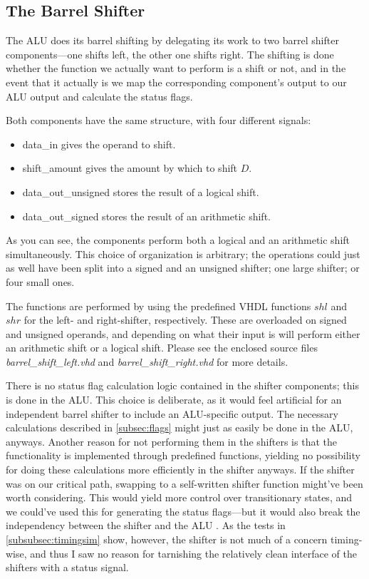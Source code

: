 \documentclass{article}
\begin{document}
\subsection{The Barrel Shifter}
\label{subsec:barrelshifter}
The ALU does its barrel shifting by delegating its work to two barrel shifter components---one shifts left, the other one shifts right. The shifting is done whether the function we actually want to perform is a shift or not, and in the event that it actually is we map the corresponding component's output to our ALU output and calculate the status flags. 

Both components have the same structure, with four different signals:
\begin{itemize}
\item data\_in gives the operand to shift.
\item shift\_amount gives the amount by which to shift $D$.
\item data\_out\_unsigned stores the result of a logical shift.
\item data\_out\_signed stores the result of an arithmetic shift.
\end{itemize}
As you can see, the components perform both a logical and an arithmetic shift simultaneously. This choice of organization is arbitrary; the operations could just as well have been split into a signed and an unsigned shifter; one large shifter; or four small ones. 

The functions are performed by using the predefined VHDL functions $shl$ and $shr$ for the left- and right-shifter, respectively. These are overloaded on signed and unsigned operands, and depending on what their input is will perform either an arithmetic shift or a logical shift. Please see the enclosed source files \emph{barrel\_shift\_left.vhd} and \emph{barrel\_shift\_right.vhd} for more details. 

There is no status flag calculation logic contained in the shifter components; this is done in the ALU. This choice is deliberate, as it would feel artificial for an independent barrel shifter to include an ALU-specific output. The necessary calculations described in \autoref{subsec:flags} might just as easily be done in the ALU, anyways. Another reason for not performing them in the shifters is that the functionality is implemented through predefined functions, yielding no  possibility for doing these calculations more efficiently in the shifter anyways. If the shifter was on our critical path, swapping to a self-written shifter function might've been worth considering. This would yield more control over transitionary states, and we could've used this for generating the status flags---but it would also break the independency between the shifter and the ALU . As the tests in \autoref{subsubsec:timingsim} show, however, the shifter is not much of a concern timing-wise, and thus I saw no reason for tarnishing the relatively clean interface of the shifters with a status signal.
\end{document}
